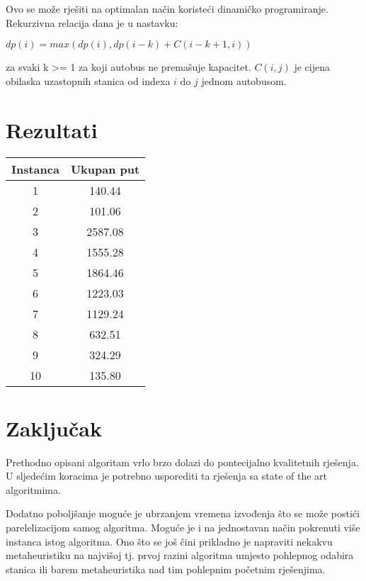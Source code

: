\documentclass[times, utf8, seminar, numeric]{fer}
\begin{document}
Ovo se može rješiti na optimalan način koristeći dinamičko programiranje. Rekurzivna relacija dana je u nastavku:

$dp(i) = max(dp(i), dp(i-k)+C(i-k+1,i))$

za svaki k >= 1 za koji autobus ne premašuje kapacitet. $C(i,j)$ je cijena obilaska uzastopnih stanica od indexa $i$ do $j$ jednom autobusom.

\chapter{Rezultati}

\begin{center}
 \begin{tabular}{||c c||} 
 \hline
 Instanca & Ukupan put \\ [0.5ex] 
 \hline\hline
 1 & 140.44 \\ 
 \hline
 2 & 101.06 \\
 \hline
 3 & 2587.08\\
 \hline
 4 & 1555.28 \\
 \hline
 5 & 1864.46 \\
 \hline
 6 & 1223.03 \\
 \hline
 7 & 1129.24 \\
 \hline
 8 & 632.51 \\
 \hline
 9 & 324.29 \\
 \hline
 10 & 135.80 \\ [1ex] 
 \hline
\end{tabular}
\end{center}



\chapter{Zaključak}

Prethodno opisani algoritam vrlo brzo dolazi do pontecijalno kvalitetnih rješenja. U sljedećim koracima je potrebno usporediti ta rješenja sa state of the art algoritmima.

Dodatno poboljšanje moguće je ubrzanjem vremena izvođenja što se može postići parelelizacijom samog algoritma. Moguće je i na jednostavan način pokrenuti više instanca istog algoritma. Ono što se još čini prikladno je napraviti nekakvu metaheuristiku na najvišoj tj. prvoj razini algoritma umjesto pohlepnog odabira stanica ili barem metaheuristika nad tim pohlepnim početnim rješenjima.

%
%
\end{document}
